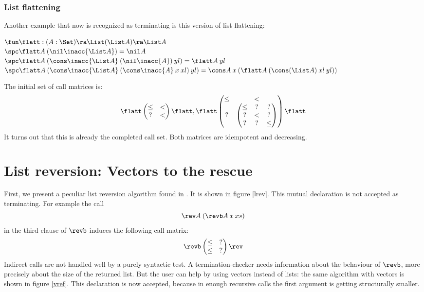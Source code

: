\subsubsection{List flattening}
Another example that now is recognized as terminating is this version of list flattening:
\begin{bsp}
$\fun \flatt : (A : \Set ) \ra \List (\List A) \ra \List A$\\
$\spc \flatt A \: (\nil \inacc{\List A}) = \nil A $\\
$\spc \flatt A \: (\cons \inacc{\List A} \: (\nil \inacc{A}) \: yl) = \flatt A \: yl $\\
$\spc \flatt A \: (\cons \inacc{\List A} \: (\cons \inacc{A} \: x \: xl) \: yl)  = \cons A \: x \: (\flatt A \: (\cons (\List A) \: xl \: yl))$
\end{bsp}
\noindent The initial set of call matrices is:
\[
\flatt \begin{pmatrix}
\leq & < \\
?    & < 
\end{pmatrix}\flatt
, 
\flatt \begin{pmatrix}
\leq & < \\
?    & 
\begin{pmatrix}
\leq &  ?  & ? \\
?    &  <  & ? \\
?    &  ?  & \leq 
\end{pmatrix}
\end{pmatrix}\flatt
\] 
It turns out that this is already the completed call set.
Both matrices are idempotent and decreasing.

\section{List reversion: Vectors to the rescue}
First, we present a peculiar list reversion algorithm found in \cite{blanqui04typebased}.
It is shown in figure \ref{lrev}. This mutual declaration is not accepted as terminating. 
For example the call 
\[\rev A \: (\revb A \: x \: xs)\]
in the third clause of $\revb$ induces the following call matrix:
\[
\revb \begin{pmatrix}
\leq & ? \\
\leq & ?  
\end{pmatrix}\rev
\] 
Indirect calls are not handled well by a purely syntactic test.
A termination-checker needs information about the behaviour of $\revb$, more precisely 
about the size of the returned list.
But the user can help by using vectors instead of lists: the same algorithm with vectors is shown in figure \ref{vref}. 
This declaration is now accepted, because in enough recursive calls the first argument is getting structurally smaller.

